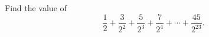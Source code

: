 Find the value of
\[
\dfrac{1}{2}+\dfrac{3}{2^2}+\dfrac{5}{2^3}+\dfrac{7}{2^4}+\cdots+\dfrac{45}{2^{23}} .
\]
